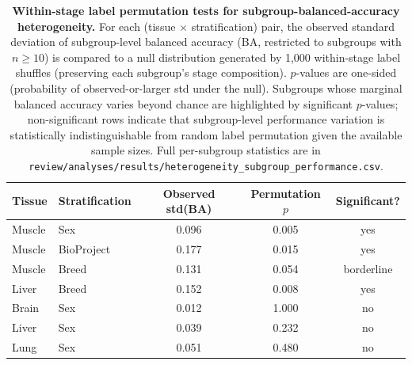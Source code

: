 \documentclass[10pt,a4paper]{article}
\begin{document}
\clearpage
\begin{table}[H]
  \centering
  \caption{\textbf{Within-stage label permutation tests for subgroup-balanced-accuracy heterogeneity.} For each (tissue $\times$ stratification) pair, the observed standard deviation of subgroup-level balanced accuracy (BA, restricted to subgroups with $n \geq 10$) is compared to a null distribution generated by 1{,}000 within-stage label shuffles (preserving each subgroup's stage composition). $p$-values are one-sided (probability of observed-or-larger std under the null). Subgroups whose marginal balanced accuracy varies beyond chance are highlighted by significant $p$-values; non-significant rows indicate that subgroup-level performance variation is statistically indistinguishable from random label permutation given the available sample sizes. Full per-subgroup statistics are in \texttt{review/analyses/results/heterogeneity\_subgroup\_performance.csv}.}
  \label{tab:S9}
  \footnotesize
  \setlength{\tabcolsep}{6pt}
  \begin{tabular}{llccc}
    \toprule
    Tissue & Stratification & Observed std(BA) & Permutation $p$ & Significant? \\
    \midrule
    Muscle & Sex         & 0.096 & 0.005 & yes \\
    Muscle & BioProject  & 0.177 & 0.015 & yes \\
    Muscle & Breed       & 0.131 & 0.054 & borderline \\
    Liver  & Breed       & 0.152 & 0.008 & yes \\
    Brain  & Sex         & 0.012 & 1.000 & no \\
    Liver  & Sex         & 0.039 & 0.232 & no \\
    Lung   & Sex         & 0.051 & 0.480 & no \\
    \bottomrule
  \end{tabular}
\end{table}



\end{document}
